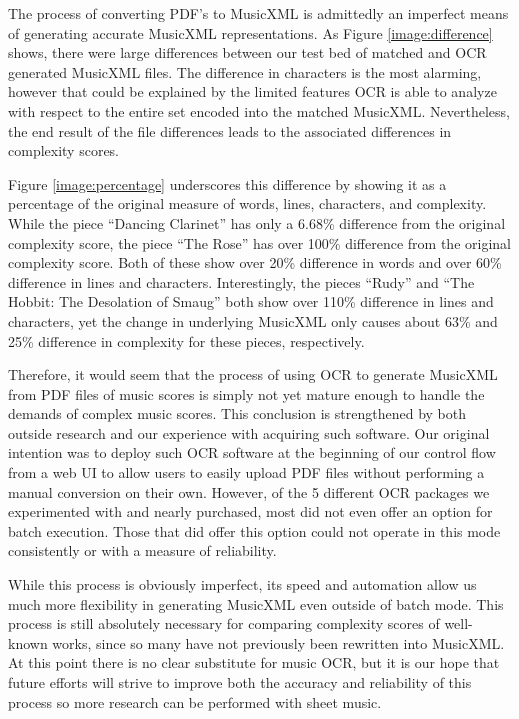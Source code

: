 \documentclass[12pt]{report}
\begin{document}
The process of converting PDF's to MusicXML is admittedly an imperfect means of generating accurate MusicXML representations. As Figure \ref{image:difference} shows, there were large differences between our test bed of matched and OCR generated MusicXML files. The difference in characters is the most alarming, however that could be explained by the limited features OCR is able to analyze with respect to the entire set encoded into the matched MusicXML. Nevertheless, the end result of the file differences leads to the associated differences in complexity scores.

Figure \ref{image:percentage} underscores this difference by showing it as a percentage of the original measure of words, lines, characters, and complexity. While the piece ``Dancing Clarinet'' has only a 6.68\% difference from the original complexity score, the piece ``The Rose'' has over 100\% difference from the original complexity score. Both of these show over 20\% difference in words and over 60\% difference in lines and characters. Interestingly, the pieces ``Rudy'' and ``The Hobbit: The Desolation of Smaug'' both show over 110\% difference in lines and characters, yet the change in underlying MusicXML only causes about 63\% and 25\% difference in complexity for these pieces, respectively.

Therefore, it would seem that the process of using OCR to generate MusicXML from PDF files of music scores is simply not yet mature enough to handle the demands of complex music scores. This conclusion is strengthened by both outside research \cite{byrd2006prospects} and our experience with acquiring such software. Our original intention was to deploy such OCR software at the beginning of our control flow from a web UI to allow users to easily upload PDF files without performing a manual conversion on their own. However, of the 5 different OCR packages we experimented with and nearly purchased, most did not even offer an option for batch execution. Those that did offer this option could not operate in this mode consistently or with a measure of reliability.

While this process is obviously imperfect, its speed and automation allow us much more flexibility in generating MusicXML even outside of batch mode. This process is still absolutely necessary for comparing complexity scores of well-known works, since so many have not previously been rewritten into MusicXML. At this point there is no clear substitute for music OCR, but it is our hope that future efforts will strive to improve both the accuracy and reliability of this process so more research can be performed with sheet music.
\end{document}
